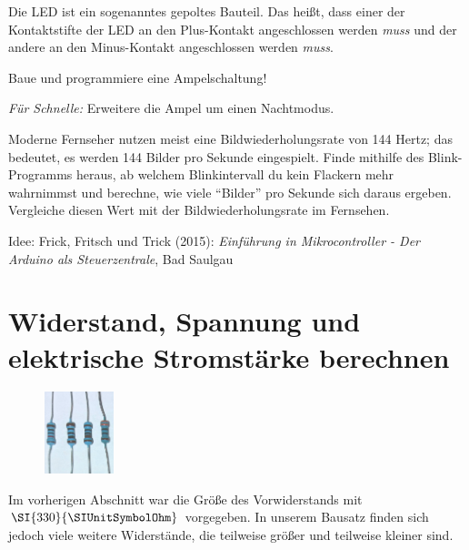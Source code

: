 Die LED ist ein sogenanntes gepoltes Bauteil. Das heißt, dass einer der Kontaktstifte der LED an den Plus-Kontakt angeschlossen werden \emph{muss} und der andere an den Minus-Kontakt angeschlossen werden \emph{muss}.

\begin{projekt}[Ampel]\label{proj:ampel}
	Baue und programmiere eine Ampelschaltung!
	
	\emph{Für Schnelle:} Erweitere die Ampel um einen Nachtmodus.
\end{projekt}


\begin{projekt}[Augentestgerät]\label{proj:augentest}
	Moderne Fernseher nutzen meist eine Bildwiederholungsrate von 144 Hertz; das bedeutet, es werden 144 Bilder pro Sekunde eingespielt. Finde mithilfe des Blink-Programms heraus, ab welchem Blinkintervall du kein Flackern mehr wahrnimmst und berechne, wie viele \enquote{Bilder} pro Sekunde sich daraus ergeben. Vergleiche diesen Wert mit der Bildwiederholungsrate im Fernsehen.
	
	{\scriptsize Idee: Frick, Fritsch und Trick (2015): \emph{Einführung in Mikrocontroller - Der Arduino als Steuerzentrale}, Bad Saulgau}
\end{projekt}


\newpage

\section{Widerstand, Spannung und elektrische Stromstärke berechnen}

\begin{figure}
	\centering
	\vspace{-\baselineskip}
	\includegraphics[width=0.18\textwidth,angle=90]{pics/Widerstaende.jpg}
	\vspace{-3\baselineskip}
	\label{abb:widerstaende}
\end{figure}
Im vorherigen Abschnitt war die Größe des Vorwiderstands mit $\SI{330}{\SIUnitSymbolOhm}$ vorgegeben. 
In unserem Bausatz finden sich jedoch viele weitere Widerstände, die teilweise größer und teilweise kleiner sind.

